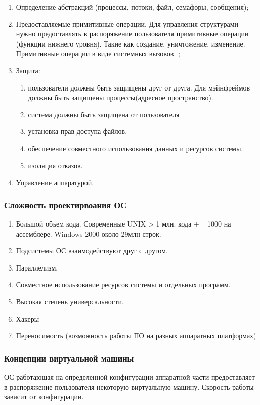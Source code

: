 \begin{enumerate}
	\item Определение абстракций (процессы, потоки, файл, семафоры, сообщения);
	\item Предоставляемые примитивные операции. Для управления структурами нужно предоставлять в распоряжение пользователя примитивные операции (функции нижнего уровня). Такие как создание, уничтожение, изменение. Примитивные операции в виде системных вызовов. ;
	\item Защита:
	\begin{enumerate}
		\item пользователи должны быть защищены друг от друга.  Для мэйнфреймов должны быть защищены процессы(адресное пространство). 
		\item система должны быть защищена от пользователя
		\item установка прав доступа файлов.
		\item обеспечение совместного использования данных и ресурсов системы.
		\item изоляция отказов. 
	\end{enumerate}
	\item Управление аппаратурой.
\end{enumerate}

\subsubsection{Сложность проектирвоания ОС}
\begin{enumerate}
	\item Большой объем кода. Современные UNIX > 1  млн. кода + ~ 1000 на ассемблере. Windows 2000 около 29млн строк.
	\item Подсистемы ОС взаимодействуют друг с другом.
	\item Параллелизм.
	\item Совместное использование ресурсов системы и отдельных программ.
	\item Высокая степень универсальности.
	\item Хакеры
	\item Переносимость (возможность работы ПО на разных аппаратных платформах)
\end{enumerate}


\subsubsection{Концепции виртуальной машины}
ОС работающая на определенной конфигурации аппаратной части предоставляет в распоряжение пользователя некоторую виртуальную машину. Скорость работы зависит от конфигурации.

